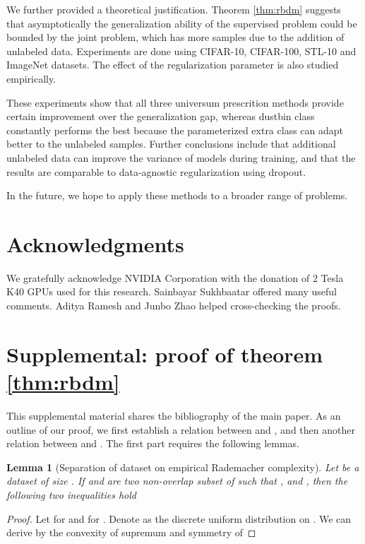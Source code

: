 \documentclass[letterpaper]{article}
\newtheorem{lemma}{Lemma}
\begin{document}
We further provided a theoretical justification. Theorem \ref{thm:rbdm} suggests that asymptotically the generalization ability of the supervised problem could be bounded by the joint problem, which has more samples due to the addition of unlabeled data. Experiments are done using CIFAR-10, CIFAR-100, STL-10 and ImageNet datasets. The effect of the regularization parameter is also studied empirically.

These experiments show that all three universum prescrition methods provide certain improvement over the generalization gap, whereas dustbin class constantly performs the best because the parameterized extra class can adapt better to the unlabeled samples. Further conclusions include that additional unlabeled data can improve the variance of models during training, and that the results are comparable to data-agnostic regularization using dropout.

In the future, we hope to apply these methods to a broader range of problems.

\section*{Acknowledgments}

We gratefully acknowledge NVIDIA Corporation with the donation of 2 Tesla K40 GPUs used for this research. Sainbayar Sukhbaatar offered many useful comments. Aditya Ramesh and Junbo Zhao helped cross-checking the proofs.




\vfill
\pagebreak

\section*{Supplemental: proof of theorem \ref{thm:rbdm}}

This supplemental material shares the bibliography of the main paper. As an outline of our proof, we first establish a relation between  and , and then another relation between  and . The first part requires the following lemmas.

\begin{lemma}[Separation of dataset on empirical Rademacher complexity]
  \label{lem:sepr}
  Let  be a dataset of size . If  and  are two non-overlap subset of  such that ,  and , then the following two inequalities hold
  
\end{lemma}
\begin{proof}
  Let  for  and  for . Denote  as the discrete uniform distribution on . We can derive by the convexity of supremum and symmetry of 
  
\end{proof}
\end{document}

